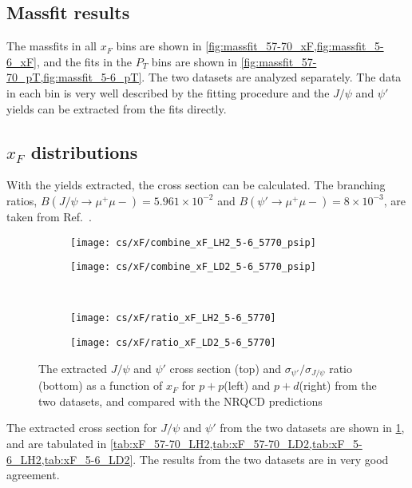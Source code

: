 \documentclass[../main.tex]{subfiles}
\begin{document}
\subsection{Massfit results}
The massfits in all $x_F$ bins are shown in \cref{fig:massfit_57-70_xF,fig:massfit_5-6_xF},
and the fits in the $P_T$ bins are shown in \cref{fig:massfit_57-70_pT,fig:massfit_5-6_pT}.
The two datasets are analyzed separately. The data in each bin is very well described by the fitting procedure
and the $J/\psi$ and $\psi'$ yields can be extracted from the fits directly.

\FloatBarrier

\subsection{\texorpdfstring{$x_F$}{x\_F} distributions}
With the yields extracted, the cross section can be calculated.
The branching ratios, $B\left(J/\psi\to\mu^+\mu-\right)=5.961\times 10^{-2}$
and $B\left(\psi'\to\mu^+\mu-\right)=8\times 10^{-3}$, are taken from Ref.~\cite{workman2022}.

\begin{figure}[h!]
	\centering
	\begin{subfigure}{0.45\linewidth}
		\texttt{[image: cs/xF/combine\_xF\_LH2\_5-6\_5770\_psip]}
	\end{subfigure}
	\centering
	\begin{subfigure}{0.45\linewidth}
		\texttt{[image: cs/xF/combine\_xF\_LD2\_5-6\_5770\_psip]}
	\end{subfigure}
	\\
	\begin{subfigure}{0.45\linewidth}
		\texttt{[image: cs/xF/ratio\_xF\_LH2\_5-6\_5770]}
	\end{subfigure}
	\begin{subfigure}{0.45\linewidth}
		\texttt{[image: cs/xF/ratio\_xF\_LD2\_5-6\_5770]}
	\end{subfigure}
	\caption{The extracted $J/\psi$ and $\psi'$ cross section (top) and $\sigma_{\psi'}/\sigma_{J/\psi}$
		ratio (bottom) as a function of $x_F$ for $p+p$(left) and $p+d$(right) from the two datasets,
		and compared with the NRQCD predictions}
	\label{fig:cs_xF}
\end{figure}

The extracted cross section for $J/\psi$ and $\psi'$ from the two datasets are shown in \cref{fig:cs_xF}, and are
tabulated in \cref{tab:xF_57-70_LH2,tab:xF_57-70_LD2,tab:xF_5-6_LH2,tab:xF_5-6_LD2}.
The results from the two datasets are in very good agreement.
\end{document}
